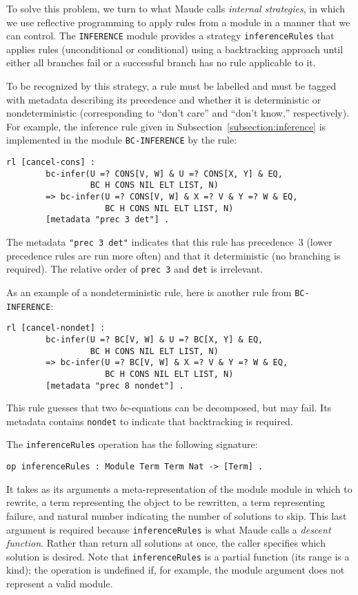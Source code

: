 \documentclass[11pt]{article}
\newcommand{\Bc}{\mathit{bc}}
\begin{document}
To solve this problem, we turn to what Maude calls \emph{internal strategies},
in which we use reflective programming to apply rules from a module in a manner
that we can control. The \lstinline|INFERENCE| module provides a strategy
\lstinline|inferenceRules| that applies rules (unconditional or conditional)
using a backtracking approach until either all branches fail or a successful
branch has no rule applicable to it.

To be recognized by this strategy, a rule must be labelled and must be tagged
with metadata describing its precedence and whether it is deterministic or
nondeterministic (corresponding to ``don't care'' and ``don't know,''
respectively). For example, the inference rule given in
Subsection~\ref{subsection:inference} is implemented in the module
\lstinline|BC-INFERENCE| by the rule:
\begin{lstlisting}[language=Maude, style=smalllisting]
    rl [cancel-cons] :
        bc-infer(U =? CONS[V, W] & U =? CONS[X, Y] & EQ,
                 BC H CONS NIL ELT LIST, N)
        => bc-infer(U =? CONS[V, W] & X =? V & Y =? W & EQ,
                    BC H CONS NIL ELT LIST, N)
        [metadata "prec 3 det"] .
\end{lstlisting}
The metadata \lstinline|"prec 3 det"| indicates that this rule has precedence~3
(lower precedence rules are run more often) and that it deterministic (no
branching is required). The relative order of \lstinline|prec 3| and
\lstinline|det| is irrelevant.

As an example of a nondeterministic rule, here is another rule from
\lstinline|BC-INFERENCE|:
\begin{lstlisting}[language=Maude, style=smalllisting]
    rl [cancel-nondet] :
        bc-infer(U =? BC[V, W] & U =? BC[X, Y] & EQ,
                 BC H CONS NIL ELT LIST, N)
        => bc-infer(U =? BC[V, W] & X =? V & Y =? W & EQ,
                    BC H CONS NIL ELT LIST, N)
        [metadata "prec 8 nondet"] .
\end{lstlisting}
This rule guesses that two $\Bc$-equations can be decomposed, but may fail. Its
metadata contains \lstinline|nondet| to indicate that backtracking is required.

The \lstinline|inferenceRules| operation has the following signature:
\begin{lstlisting}[language=Maude, style=smalllisting]
    op inferenceRules : Module Term Term Nat -> [Term] .
\end{lstlisting}
It takes as its arguments a meta-representation of the module module in which
to rewrite, a term representing the object to be rewritten, a term representing
failure, and natural number indicating the number of solutions to skip. This
last argument is required because \lstinline|inferenceRules| is what Maude
calls a \emph{descent function}. Rather than return all solutions at once, the
caller specifies which solution is desired. Note that
\lstinline|inferenceRules| is a partial function (its range is a kind); the
operation is undefined if, for example, the module argument does not represent
a valid module.
\end{document}
